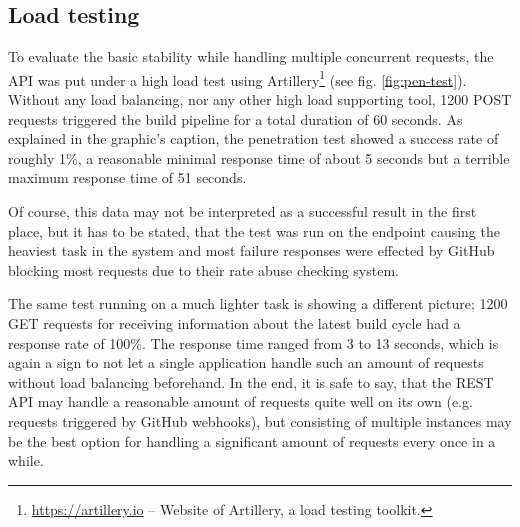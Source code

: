 \subsection{Load testing}
To evaluate the basic stability while handling multiple concurrent requests, the API was put under a high load test using Artillery\footnote{\url{https://artillery.io} -- Website of Artillery, a load testing toolkit.} (see fig. \ref{fig:pen-test}). Without any load balancing, nor any other high load supporting tool, 1200 POST requests triggered the build pipeline for a total duration of 60 seconds. As explained in the graphic's caption, the penetration test showed a success rate of roughly 1\%, a reasonable minimal response time of about 5 seconds but a terrible maximum response time of 51 seconds.

Of course, this data may not be interpreted as a successful result in the first place, but it has to be stated, that the test was run on the endpoint causing the heaviest task in the system and most failure responses were effected by GitHub blocking most requests due to their rate abuse checking system.

The same test running on a much lighter task is showing a different picture; 1200 GET requests for receiving information about the latest build cycle had a response rate of 100\%. The response time ranged from 3 to 13 seconds, which is again a sign to not let a single application handle such an amount of requests without load balancing beforehand. In the end, it is safe to say, that the REST API may handle a reasonable amount of requests quite well on its own (e.g. requests triggered by GitHub webhooks), but consisting of multiple instances may be the best option for handling a significant amount of requests every once in a while.
